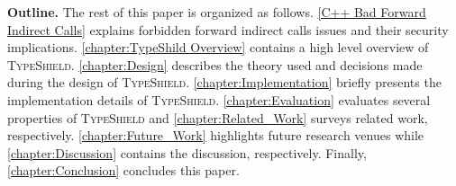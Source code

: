 \label{Outline}
\textbf{Outline.} The rest of this paper is organized as follows.
\cref{C++ Bad Forward Indirect Calls} explains forbidden forward indirect calls issues and their security implications.
\cref{chapter:TypeShild Overview} contains a high level overview of \textsc{TypeShield}.
\cref{chapter:Design} describes the theory used and decisions made during the design of \textsc{TypeShield}.
\cref{chapter:Implementation} briefly presents the implementation details of \textsc{TypeShield}.
\cref{chapter:Evaluation} evaluates several properties of \textsc{TypeShield} and
\cref{chapter:Related_Work} surveys related work, respectively.
\cref{chapter:Future_Work} highlights future research venues while 
\cref{chapter:Discussion} contains the discussion, respectively.
Finally, \cref{chapter:Conclusion} concludes this paper.


